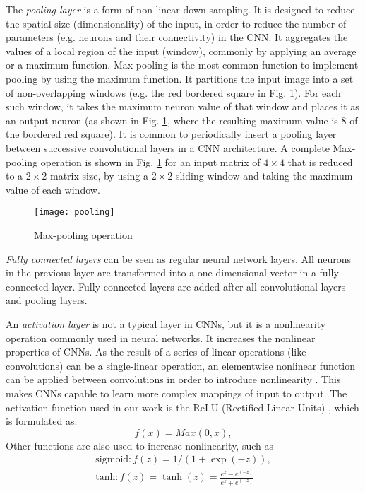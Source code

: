 The \textit{pooling layer} is a form of non-linear down-sampling. It is designed to reduce the spatial size (dimensionality) of the input, in order to reduce the number of parameters (e.g. neurons and their connectivity) in the CNN. It aggregates the values of a local region of the input (window), commonly by applying an average or a maximum function.  Max pooling is the most common function to implement pooling by using the maximum function. It partitions the input image into a set of non-overlapping windows (e.g. the red bordered square in Fig. \ref{fig_pool}). For each such window, it takes the maximum neuron value of that window and places it as an output neuron (as shown in Fig. \ref{fig_pool}, where the resulting maximum value is 8 of the bordered red square). It is common to periodically insert a pooling layer between successive convolutional layers in a CNN architecture.  A complete Max-pooling operation is shown in Fig. \ref{fig_pool} for an input matrix of $4\times 4$ that is reduced to a $2\times 2$ matrix size, by using a $2\times 2$ sliding window and taking the maximum value of each window.
\begin{figure}[!t]
\centering
\texttt{[image: pooling]}
\caption{Max-pooling operation}
\label{fig_pool}
\end{figure}

\textit{Fully connected layers} can be seen as regular neural network layers. All neurons in the previous layer are transformed into a one-dimensional vector in a fully connected layer. Fully connected layers are added after all convolutional layers and pooling layers.

An \textit{activation layer} is not a typical layer in CNNs, but it is a nonlinearity operation commonly used in neural networks. It increases the nonlinear properties of CNNs. As the result of a series of linear operations (like convolutions) can be a single-linear operation, an elementwise nonlinear function can be applied between convolutions in order to introduce nonlinearity \cite{bergado2018recurrent}. This makes CNNs capable to learn more complex mappings of input to output. The activation function used in our work is the ReLU (Rectified Linear Units) \cite{nair2010rectified}, which is formulated as:
\begin{equation}
f(x)=Max(0,x),
\end{equation}
Other functions are also used to increase nonlinearity, such as
\begin{equation}
\begin{split}
\text{sigmoid}: f(z)=1/(1+\exp(-z) ),\\
\text{tanh}: f(z)=\tanh(z)=\frac{e^z-e^{(-z)}}{e^z+e^{(-z)}}
\end{split}
\end{equation}

